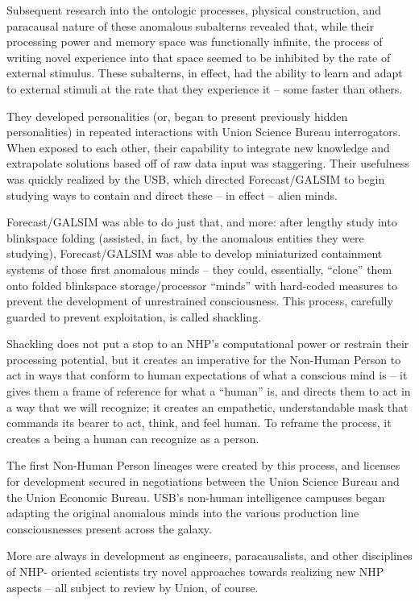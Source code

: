 Subsequent research into the ontologic processes, physical construction, and paracausal nature  
of these anomalous subalterns revealed that, while their processing power and memory space  
was functionally infinite, the process of writing novel experience into that space seemed to be  
inhibited by the rate of external stimulus. These subalterns, in effect, had the ability to learn and  
adapt to external stimuli at the rate that they experience it -- some faster than others. 
 

They developed personalities (or, began to present previously hidden personalities) in repeated  
interactions with Union Science Bureau interrogators. When exposed to each other, their  
capability to integrate new knowledge and extrapolate solutions based off of raw data input was  
staggering. Their usefulness was quickly realized by the USB, which directed Forecast/GALSIM  
to begin studying ways to contain and direct these -- in effect -- alien minds. 
 

Forecast/GALSIM was able to do just that, and more: after lengthy study into blinkspace folding  
(assisted, in fact, by the anomalous entities they were studying), Forecast/GALSIM was able to  
develop miniaturized containment systems of those first anomalous minds -- they could,  
essentially, “clone” them onto folded blinkspace storage/processor “minds” with hard-coded  
measures to prevent the development of unrestrained consciousness. This process, carefully  
guarded to prevent exploitation, is called shackling. 
 

Shackling does not put a stop to an NHP’s computational power or restrain their processing  
potential, but it creates an imperative for the Non-Human Person to act in ways that conform to  
human expectations of what a conscious mind is -- it gives them a frame of reference for what a  
“human” is, and directs them to act in a way that we will recognize; it creates an empathetic,  
understandable mask that commands its bearer to act, think, and feel human. To reframe the  
process, it creates a being a human can recognize as a person.  
 

The first Non-Human Person lineages were created by this process, and licenses for  
development secured in negotiations between the Union Science Bureau and the Union  
Economic Bureau. USB’s non-human intelligence campuses began adapting the original  
anomalous minds into the various production line consciousnesses present across the galaxy. 
 

More are always in development as engineers, paracausalists, and other disciplines of NHP- 
oriented scientists try novel approaches towards realizing new NHP aspects -- all subject to  
review by Union, of course.   
 

